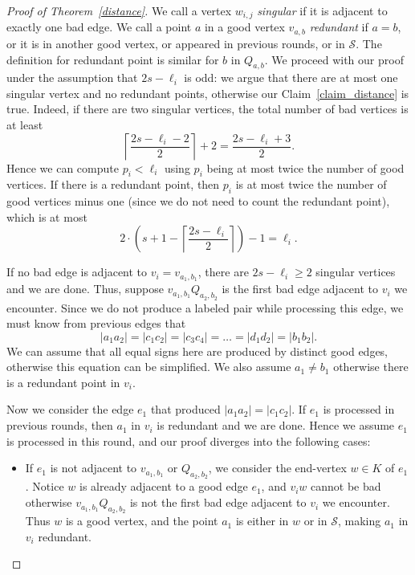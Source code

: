 \documentclass[11pt]{article}
\theoremstyle{definition}
\begin{document}
\begin{proof}[Proof of Theorem~\ref{distance}]
We call a vertex $w_{i,j}$ \textit{singular} if it is adjacent to exactly one bad edge. We call a point $a$ in a good vertex $v_{a,b}$ \textit{redundant} if $a = b$, or it is in another good vertex, or appeared in previous rounds, or in $\mathcal{S}$. The definition for redundant point is similar for $b$ in $Q_{a,b}$. We proceed with our proof under the assumption that $2s-\ell_i$ is odd: we argue that there are at most one singular vertex and no redundant points, otherwise our Claim~\ref{claim_distance} is true. Indeed, if there are two singular vertices, the total number of bad vertices is at least \begin{equation*}
    \left\lceil \frac{2s - \ell_i - 2}{2} \right\rceil + 2 = \frac{2s-\ell_i + 3}{2}.
\end{equation*} Hence we can compute $p_i < \ell_i$ using $p_i$ being at most twice the number of good vertices. If there is a redundant point, then $p_i$ is at most twice the number of good vertices minus one (since we do not need to count the redundant point), which is at most\begin{equation*}
    2 \cdot \left(s + 1 - \left\lceil \frac{2s - \ell_i}{2} \right\rceil \right) - 1 = \ell_i.
\end{equation*}

If no bad edge is adjacent to $v_i = v_{a_1,b_1}$, there are $2s-\ell_i \geq 2$ singular vertices and we are done. Thus, suppose $v_{a_1,b_1} Q_{a_2,b_2}$ is the first bad edge adjacent to $v_i$ we encounter. Since we do not produce a labeled pair while processing this edge, we must know from previous edges that \begin{equation} \label{eq:distance}
    |a_1a_2| = |c_1c_2| = |c_3c_4| = \dots = |d_1d_2| = |b_1b_2|.
\end{equation} We can assume that all equal signs here are produced by distinct good edges, otherwise this equation can be simplified. We also assume $a_1\neq b_1$ otherwise there is a redundant point in $v_i$.

Now we consider the edge $e_1$ that produced $|a_1a_2| = |c_1c_2|$. If $e_1$ is processed in previous rounds, then $a_1$ in $v_i$ is redundant and we are done. Hence we assume $e_1$ is processed in this round, and our proof diverges into the following cases:\begin{itemize}

    \item If $e_1$ is not adjacent to $v_{a_1,b_1}$ or $Q_{a_2,b_2}$, we consider the end-vertex $w \in K$ of $e_1$. Notice $w$ is already adjacent to a good edge $e_1$, and $v_i w$ cannot be bad otherwise $v_{a_1,b_1} Q_{a_2,b_2}$ is not the first bad edge adjacent to $v_i$ we encounter. Thus $w$ is a good vertex, and the point $a_1$ is either in $w$ or in $\mathcal{S}$, making $a_1$ in $v_i$ redundant.
    

\end{itemize}
\end{proof}
\end{document}
